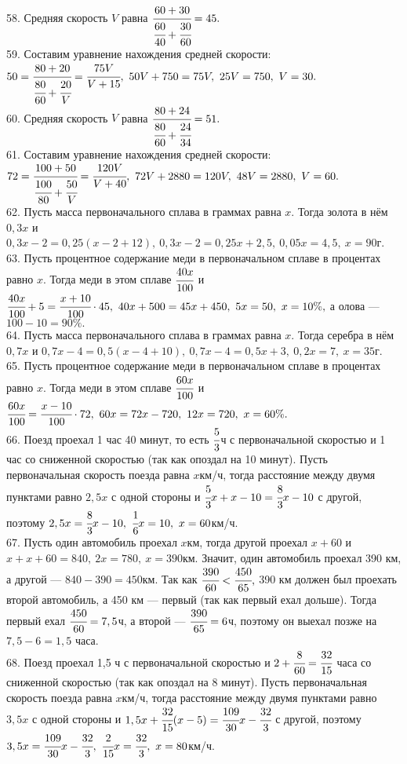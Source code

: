 58. Средняя скорость $V$ равна $\cfrac{60+30}{\cfrac{60}{40}+\cfrac{30}{60}}=45.$\\
59. Составим уравнение нахождения средней скорости: $50=\cfrac{80+20}{\cfrac{80}{60}+\cfrac{20}{V}}=\cfrac{75V}{V+15},\ 50V+750=75V,\ 25V=750,\ V=30.$\\
60. Средняя скорость $V$ равна $\cfrac{80+24}{\cfrac{80}{60}+\cfrac{24}{34}}=51.$\\
61. Составим уравнение нахождения средней скорости: $72=\cfrac{100+50}{\cfrac{100}{80}+\cfrac{50}{V}}=\cfrac{120V}{V+40},\ 72V+2880=120V,\ 48V=2880,\ V=60.$\\
62. Пусть масса первоначального сплава в граммах равна $x.$ Тогда золота в нём $0,3x$ и $0,3x-2=0,25(x-2+12),\ 0,3x-2=0,25x+2,5,\ 0,05x=4,5,\ x=90$г.\\
63. Пусть процентное содержание меди в первоначальном сплаве в процентах равно $x.$ Тогда меди в этом сплаве $\cfrac{40x}{100}$ и $\cfrac{40x}{100}+5=\cfrac{x+10}{100}\cdot45,\ 40x+500=45x+450,\ 5x=50,\ x=10\%,$ а олова --- $100-10=90\%.$\\
64. Пусть масса первоначального сплава в граммах равна $x.$ Тогда серебра в нём $0,7x$ и $0,7x-4=0,5(x-4+10),\ 0,7x-4=0,5x+3,\ 0,2x=7,\ x=35$г.\\
65. Пусть процентное содержание меди в первоначальном сплаве в процентах равно $x.$ Тогда меди в этом сплаве $\cfrac{60x}{100}$ и $\cfrac{60x}{100}=\cfrac{x-10}{100}\cdot72,\ 60x=72x-720,\ 12x=720,\ x=60\%.$\\
66. Поезд проехал 1 час 40 минут, то есть $\cfrac{5}{3}$ч с первоначальной скоростью и 1 час со сниженной скоростью (так как опоздал на 10 минут). Пусть первоначальная скорость поезда равна $x$км/ч, тогда расстояние между двумя пунктами равно $2,5x$ с одной стороны и  $\cfrac{5}{3}x+x-10=\cfrac{8}{3}x-10$ с другой, поэтому $2,5x=\cfrac{8}{3}x-10,\ \cfrac{1}{6}x=10,\ x=60$км/ч.\\
67. Пусть один автомобиль проехал $x$км, тогда другой проехал $x+60$ и $x+x+60=840,\ 2x=780,\ x=390$км. Значит, один автомобиль проехал 390 км, а другой --- $840-390=450$км. Так как $\cfrac{390}{60}<\cfrac{450}{65},$ 390 км должен был проехать второй автомобиль, а 450 км --- первый (так как первый ехал дольше). Тогда первый ехал $\cfrac{450}{60}=7,5$ч, а второй --- $\cfrac{390}{65}=6$ч, поэтому он выехал позже на $7,5-6=1,5$ часа.\\
68. Поезд проехал 1,5 ч с первоначальной скоростью и $2+\cfrac{8}{60}=\cfrac{32}{15}$ часа со сниженной скоростью (так как опоздал на 8 минут). Пусть первоначальная скорость поезда равна $x$км/ч, тогда расстояние между двумя пунктами равно $3,5x$ с одной стороны и  $1,5x+\cfrac{32}{15}(x-5)=\cfrac{109}{30}x-\cfrac{32}{3}$ с другой, поэтому $3,5x=\cfrac{109}{30}x-\cfrac{32}{3},\ \cfrac{2}{15}x=\cfrac{32}{3},\ x=80$км/ч.\\
